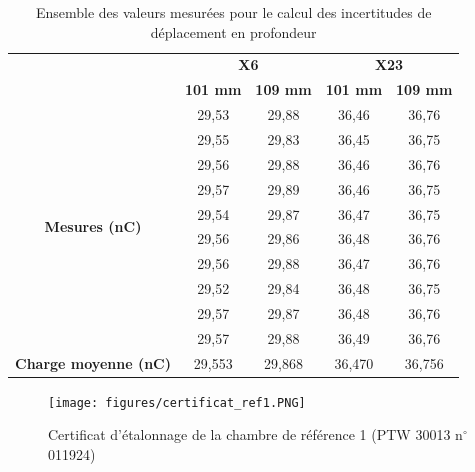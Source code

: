 \documentclass{article}
\begin{document}
\begin{table}[h]
  \centering
  \begin{tabular}{c|cc|cc|}
  \cline{2-5}
  \textbf{} & \multicolumn{2}{c|}{\textbf{X6}} & \multicolumn{2}{c|}{\textbf{X23}} \\ \cline{2-5} 
  \textbf{} & \textbf{101 mm} & \textbf{109 mm} & \textbf{101 mm} & \textbf{109 mm} \\ \hline
  \multicolumn{1}{|c|}{\multirow{10}{*}{\textbf{Mesures (nC)}}} & 29,53 & 29,88 & 36,46 & 36,76 \\
  \multicolumn{1}{|c|}{} & 29,55 & 29,83 & 36,45 & 36,75 \\
  \multicolumn{1}{|c|}{} & 29,56 & 29,88 & 36,46 & 36,76 \\
  \multicolumn{1}{|c|}{} & 29,57 & 29,89 & 36,46 & 36,75 \\
  \multicolumn{1}{|c|}{} & 29,54 & 29,87 & 36,47 & 36,75 \\
  \multicolumn{1}{|c|}{} & 29,56 & 29,86 & 36,48 & 36,76 \\
  \multicolumn{1}{|c|}{} & 29,56 & 29,88 & 36,47 & 36,76 \\
  \multicolumn{1}{|c|}{} & 29,52 & 29,84 & 36,48 & 36,75 \\
  \multicolumn{1}{|c|}{} & 29,57 & 29,87 & 36,48 & 36,76 \\
  \multicolumn{1}{|c|}{} & 29,57 & 29,88 & 36,49 & 36,76 \\ \hline
  \multicolumn{1}{|c|}{\textbf{Charge moyenne   (nC)}} & 29,553 & 29,868 & 36,470 & 36,756 \\ \hline
  \end{tabular}
  \caption{Ensemble des valeurs mesurées pour le calcul des incertitudes de déplacement en profondeur}
  \label{table_mesure_dep_prof}
\end{table}

\begin{figure}[h]
  \centering
  \texttt{[image: figures/certificat\_ref1.PNG]}
  \caption{Certificat d'étalonnage de la chambre de référence 1 (PTW 30013 n$^{\circ}$ 011924)}
\end{figure}

\clearpage


\nocite{*}
\end{document}
